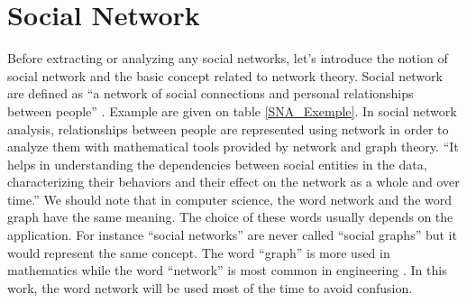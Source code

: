 \documentclass[a4paper, 12pt]{report}
\begin{document}
\chapter{Social Network}
\begin{table}
\center
{}
\caption{Example of social networks \citep{SNA_Overview}}\label{SNA_Exemple}
\end{table}

 Before extracting or analyzing any social networks, let's introduce the notion of social network and the basic concept related to network theory.
Social network are defined as ``a network of social connections and personal relationships between people'' \citep{SNA_Overview}. Example are given on table \ref{SNA_Exemple}.
 In social network analysis, relationships between people are represented using network in order to analyze them with mathematical tools provided by network 
and graph theory. ``It helps in understanding the
dependencies between social entities in the data, characterizing
their behaviors and their effect on the network as
a whole and over time.'' \citep{SNA_Overview}
We should note that in computer science, the word network and the word graph have the same meaning. The choice of these words usually depends on the application. For instance ``social networks'' are never called  ``social graphs'' 
but it would represent the same concept. The word ``graph'' is more used in mathematics while the word ``network'' is most common in engineering \citep{network_theory}. In this work, the word network will be used most of the time to avoid confusion.
\end{document}
